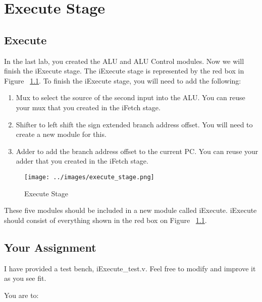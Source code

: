 \chapter{Execute Stage}

\section{Execute}

In the last lab, you created the ALU and ALU Control modules.  Now we will finish the iExecute stage.  The iExecute stage is represented by the red box in Figure ~\ref{fig:execute_stage}.  To finish the iExecute stage, you will need to add the following:
 
\begin{enumerate}
	\item Mux to select the source of the second input into the ALU.  You can reuse your mux that you created in the iFetch stage.
	\item Shifter to left shift the sign extended branch address offset.  You will need to create a new module for this.
	\item Adder to add the branch address offset to the current PC.  You can reuse your adder that you created in the iFetch stage.
\end{enumerate} 

\begin{figure}
	\caption{Execute Stage}\label{fig:execute_stage}
	\begin{center}
		\texttt{[image: ../images/execute\_stage.png]}
	\end{center}
\end{figure} 

These five modules should be included in a new module called iExecute.  iExecute should consist of everything shown in the red box on Figure ~\ref{fig:execute_stage}. 

\section{Your Assignment}
I have provided a test bench, iExecute\_test.v.  Feel free to modify and improve it as you see fit.

You are to:
